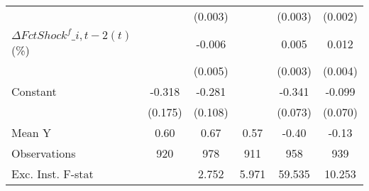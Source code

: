 {\begin{tabular}{l*{5}{c}}
                    &                     &     (0.003)         &                     &     (0.003)         &     (0.002)         \\
\addlinespace
$ \Delta FctShock^f\_{i,t-2}(t)$ (\%)&                     &      -0.006         &                     &       0.005\sym{**} &       0.012\sym{***}\\
                    &                     &     (0.005)         &                     &     (0.003)         &     (0.004)         \\
\addlinespace
Constant            &      -0.318\sym{*}  &      -0.281\sym{**} &                     &      -0.341\sym{***}&      -0.099         \\
                    &     (0.175)         &     (0.108)         &                     &     (0.073)         &     (0.070)         \\
\midrule
Mean Y              &        0.60         &        0.67         &        0.57         &       -0.40         &       -0.13         \\
Observations        &         920         &         978         &         911         &         958         &         939         \\
Exc. Inst. F-stat   &                     &       2.752         &       5.971         &      59.535         &      10.253         \\
\bottomrule
\end{tabular}
}
